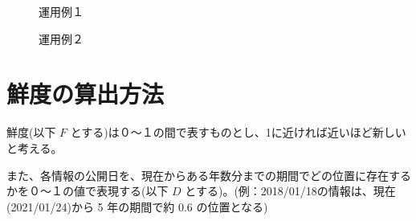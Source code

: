 \begin{figure}[htbp]
  \begin{minipage}{0.5\hsize}
    \begin{center}
    \end{center}
    \caption{運用例１}
  \end{minipage}
  \begin{minipage}{0.5\hsize}
    \begin{center}
    \end{center}
    \caption{運用例２}
  \end{minipage}
\end{figure}

\section{鮮度の算出方法}
\label{sec:imp_calculation}

鮮度(以下 $F$ とする)は０～１の間で表すものとし、1に近ければ近いほど新しいと考える。

また、各情報の公開日を、現在からある年数分までの期間でどの位置に存在するかを０～１の値で表現する(以下 $D$ とする)。(例：2018/01/18の情報は、現在(2021/01/24)から 5 年の期間で約 0.6 の位置となる)

